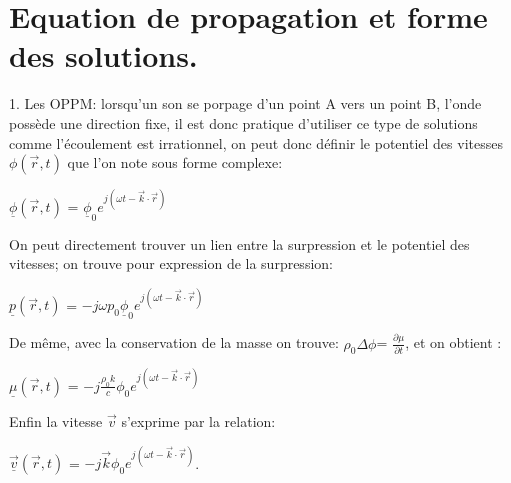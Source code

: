 \documentclass[a4paper]{article}
\begin{document}
\section{Equation de propagation et forme des solutions.}
1. Les OPPM: lorsqu'un son se porpage d'un point A vers un point B, l'onde possède une direction fixe, il est donc pratique d'utiliser ce type de solutions comme l'écoulement est irrationnel, on peut donc définir le potentiel des vitesses $\phi(\vec r,t)$ que l'on note sous forme complexe:\newline
\begin{center}
    $\underline \phi(\vec r,t)$ = $\underline \phi_{0}e^{j(\omega t - \vec k \cdot \vec r)}$
\end{center}
\newline 
On peut directement trouver un lien entre la surpression et le potentiel des vitesses; on trouve pour expression de la surpression:
\begin{center}
    $\underline p(\vec r,t)$ = $-j\omega p_{0} \underline \phi_{0}e^{j(\omega t - \vec k \cdot \vec r)}$
\end{center}
\newline 
De même, avec la conservation de la masse on trouve: $\rho_{0} \Delta \phi$= $\frac{\partial \mu}{\partial t}$, et on obtient :\newline
\begin{center}
    $\underline \mu(\vec r,t)$ = $-j\frac{\rho_{0}k}{c}\phi_{0}e^{j(\omega t - \vec k \cdot \vec r)}$
\end{center}
\newline 
Enfin la vitesse $\vec v$ s'exprime par la relation:
\begin{center}
    $\underline {\vec v}(\vec r,t)$ = $-j\vec k\phi_{0}e^{j(\omega t - \vec k \cdot \vec r)}$.
\end{center}
\end{document}
